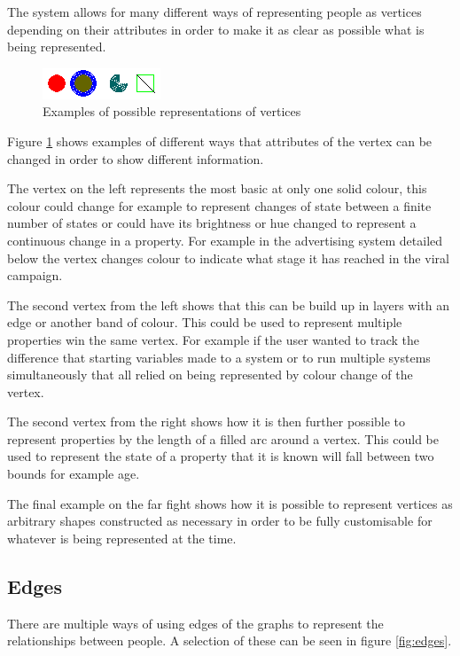 \documentclass[12pt,a4paper]{article}
\begin{document}
The system allows for many different ways of representing people as vertices depending on their attributes in order to make it as clear as possible what is being represented.

\begin{figure}[htb]
\caption{Examples of possible representations of vertices}
\label{fig:vertices}
\centering
\includegraphics[scale=1]{Nodes.png}
\end{figure}

Figure \ref{fig:vertices} shows examples of different ways that attributes of the vertex can be changed in order to show different information.

The vertex on the left represents the most basic at only one solid colour, this colour could change for example to represent changes of state between a finite number of states or could have its brightness or hue changed to represent a continuous change in a property. For example in the advertising system detailed below the vertex changes colour to indicate what stage it has reached in the viral campaign.

The second vertex from the left shows that this can be build up in layers with an edge or another band of colour. This could be used to represent multiple properties win the same vertex. For example if the user wanted to track the difference that starting variables made to a system or to run multiple systems simultaneously that all relied on being represented by colour change of the vertex.

The second vertex from the right shows how it is then further possible to represent properties by the length of a filled arc around a vertex. This could be used to represent the state of a property that it is known will fall between two bounds for example age.

The final example on the far fight shows how it is possible to represent vertices as arbitrary shapes constructed as necessary in order to be fully customisable for whatever is being represented at the time.

\subsection{Edges}

There are multiple ways of using edges of the graphs to represent the relationships between people. A selection of these can be seen in figure \ref{fig:edges}.
\end{document}
